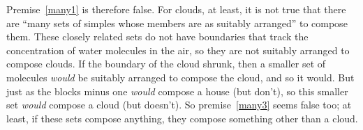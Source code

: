 \documentclass[11pt]{standalone} \newif\ifstandlone \standalonetrue
\begin{document}
\begin{spacing}{1.5}
Premise~\ref{many1} is therefore false.  For clouds, at least, it is
not true that there are ``many sets of simples whose members are as
suitably arranged'' to compose them.  These closely related sets do
not have boundaries that track the concentration of water molecules in
the air, so they are not suitably arranged to compose clouds.  If the
boundary of the cloud shrunk, then a smaller set of molecules {\em
  would} be suitably arranged to compose the cloud, and so it would.
But just as the blocks minus one {\em would} compose a house (but
don't), so this smaller set {\em would} compose a cloud (but doesn't).
So premise~\ref{many3} seems false too; at least, if these sets
compose anything, they compose something other than a cloud.

\ifstandalone


\end{spacing}
\fi
\end{document}
